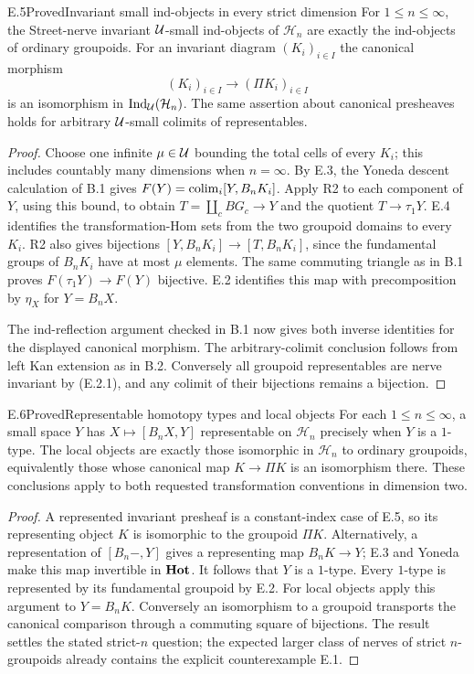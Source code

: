 \begin{claim}{E.5}{Proved}{Invariant small ind-objects in every strict dimension}
For $1\leq n\leq\infty$, the Street-nerve invariant $\mathcal U$-small ind-objects of $\mathcal H_n$ are exactly the ind-objects of ordinary groupoids. For an invariant diagram $(K_i)_{i\in I}$ the canonical morphism
\[
 (K_i)_{i\in I}\longrightarrow(\Pi K_i)_{i\in I}
\]
is an isomorphism in $\operatorname{Ind}_\mathcal U(\mathcal H_n)$. The same assertion about canonical presheaves holds for arbitrary $\mathcal U$-small colimits of representables.
\end{claim}
\begin{proof}
Choose one infinite $\mu\in\mathcal U$ bounding the total cells of every $K_i$; this includes countably many dimensions when $n=\infty$. By E.3, the Yoneda descent calculation of B.1 gives $F(Y)=\operatorname{colim}_i[Y,B_nK_i]$. Apply R2 to each component of $Y$, using this bound, to obtain $T=\coprod_cBG_c\to Y$ and the quotient $T\to\tau_1Y$. E.4 identifies the transformation-Hom sets from the two groupoid domains to every $K_i$. R2 also gives bijections $[Y,B_nK_i]\to[T,B_nK_i]$, since the fundamental groups of $B_nK_i$ have at most $\mu$ elements. The same commuting triangle as in B.1 proves $F(\tau_1Y)\to F(Y)$ bijective. E.2 identifies this map with precomposition by $\eta_X$ for $Y=B_nX$.

The ind-reflection argument checked in B.1 now gives both inverse identities for the displayed canonical morphism. The arbitrary-colimit conclusion follows from left Kan extension as in B.2. Conversely all groupoid representables are nerve invariant by (E.2.1), and any colimit of their bijections remains a bijection.
\end{proof}

\begin{claim}{E.6}{Proved}{Representable homotopy types and local objects}
For each $1\leq n\leq\infty$, a small space $Y$ has $X\mapsto[B_nX,Y]$ representable on $\mathcal H_n$ precisely when $Y$ is a $1$-type. The local objects are exactly those isomorphic in $\mathcal H_n$ to ordinary groupoids, equivalently those whose canonical map $K\to\Pi K$ is an isomorphism there. These conclusions apply to both requested transformation conventions in dimension two.
\end{claim}
\begin{proof}
A represented invariant presheaf is a constant-index case of E.5, so its representing object $K$ is isomorphic to the groupoid $\Pi K$. Alternatively, a representation of $[B_n-,Y]$ gives a representing map $B_nK\to Y$; E.3 and Yoneda make this map invertible in $\mathbf{Hot}$. It follows that $Y$ is a $1$-type. Every $1$-type is represented by its fundamental groupoid by E.2. For local objects apply this argument to $Y=B_nK$. Conversely an isomorphism to a groupoid transports the canonical comparison through a commuting square of bijections. The result settles the stated strict-$n$ question; the expected larger class of nerves of strict $n$-groupoids already contains the explicit counterexample E.1.
\end{proof}
